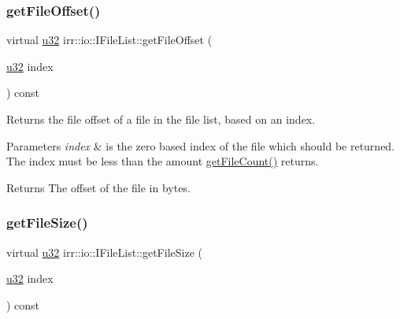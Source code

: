\subsubsection{\texorpdfstring{get\+File\+Offset()}{getFileOffset()}}
{\footnotesize\ttfamily virtual \hyperlink{namespaceirr_a0416a53257075833e7002efd0a18e804}{u32} irr\+::io\+::\+I\+File\+List\+::get\+File\+Offset (\begin{DoxyParamCaption}\item[{\hyperlink{namespaceirr_a0416a53257075833e7002efd0a18e804}{u32}}]{index }\end{DoxyParamCaption}) const\hspace{0.3cm}{\ttfamily [pure virtual]}}



Returns the file offset of a file in the file list, based on an index. 


\begin{DoxyParams}{Parameters}
{\em index} & is the zero based index of the file which should be returned. The index must be less than the amount \hyperlink{classirr_1_1io_1_1IFileList_a871861be76e18d58274c4580b1d103b9}{get\+File\+Count()} returns. \\
\hline
\end{DoxyParams}
\begin{DoxyReturn}{Returns}
The offset of the file in bytes. 
\end{DoxyReturn}
\mbox{\label{classirr_1_1io_1_1IFileList_a305561d0c5db74ac721da5d26c461b36}} 
\subsubsection{\texorpdfstring{get\+File\+Size()}{getFileSize()}}
{\footnotesize\ttfamily virtual \hyperlink{namespaceirr_a0416a53257075833e7002efd0a18e804}{u32} irr\+::io\+::\+I\+File\+List\+::get\+File\+Size (\begin{DoxyParamCaption}\item[{\hyperlink{namespaceirr_a0416a53257075833e7002efd0a18e804}{u32}}]{index }\end{DoxyParamCaption}) const\hspace{0.3cm}{\ttfamily [pure virtual]}}



